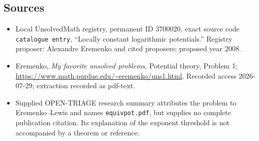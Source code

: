 \documentclass[11pt]{article}
\begin{document}
\subsection{Sources}
\begin{itemize}
\item Local UnsolvedMath registry, permanent ID \(3700020\), exact source code \texttt{catalogue entry}, ``Locally constant logarithmic potentials.'' Registry proposer: Alexandre Eremenko and cited proposers; proposed year 2008.
\item Eremenko, \emph{My favorite unsolved problems}, Potential theory, Problem 1; \url{https://www.math.purdue.edu/~eremenko/uns1.html}. Recorded access 2026-07-29; extraction recorded as pdf-text.
\item Supplied OPEN-TRIAGE research summary attributes the problem to Eremenko--Lewis and names \texttt{equivpot.pdf}, but supplies no complete publication citation. Its explanation of the exponent threshold is not accompanied by a theorem or reference.
\end{itemize}
\end{document}
